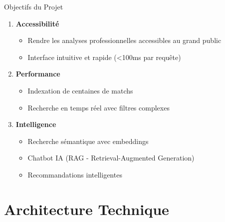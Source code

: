\documentclass[11pt]{beamer}
\begin{document}
\begin{frame}{Objectifs du Projet}
\begin{enumerate}
    \item \textbf{Accessibilité}
    \begin{itemize}
        \item Rendre les analyses professionnelles accessibles au grand public
        \item Interface intuitive et rapide (\textless 100ms par requête)
    \end{itemize}
    
    \vspace{0.2cm}
    
    \item \textbf{Performance}
    \begin{itemize}
        \item Indexation de centaines de matchs
        \item Recherche en temps réel avec filtres complexes
    \end{itemize}
    
    \vspace{0.2cm}
    
    \item \textbf{Intelligence}
    \begin{itemize}
        \item Recherche sémantique avec embeddings
        \item Chatbot IA (RAG - Retrieval-Augmented Generation)
        \item Recommandations intelligentes
    \end{itemize}
\end{enumerate}
\end{frame}

\section{Architecture Technique}
\end{document}
